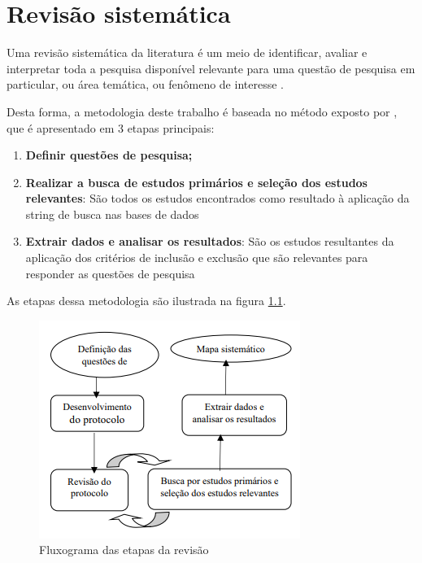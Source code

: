 \chapter{Revisão sistemática}
\label{capitulo3}
Uma revisão sistemática da literatura é um meio de identificar, avaliar e interpretar
toda a pesquisa disponível relevante para uma questão de pesquisa em particular, ou área temática, ou
fenômeno de interesse . 


Desta forma, a metodologia deste trabalho é
baseada no método exposto por \cite{kitchenham2004procedures},
que é apresentado em 3 etapas principais:

\begin{enumerate}
    \item \textbf{Definir questões de pesquisa;}
    \item \textbf{Realizar a busca de estudos primários
e seleção dos estudos relevantes}: São todos os estudos encontrados como resultado à aplicação
da string de busca nas bases de dados \cite{kitchenham2004procedures}
    \item \textbf{Extrair dados e analisar os resultados}: São os estudos resultantes da aplicação dos critérios de
inclusão e exclusão que são relevantes para responder as
questões de pesquisa \cite{kitchenham2004procedures}
\end{enumerate}

As etapas dessa metodologia são
ilustrada na figura \ref{fig:fig0}. 

\begin{figure}[H]
  \caption{Fluxograma das etapas da revisão}

  \centering
  \includegraphics[scale=1.0]{Imagens/mapeamento.png} 
  
  \label{fig:fig0}
\end{figure}

